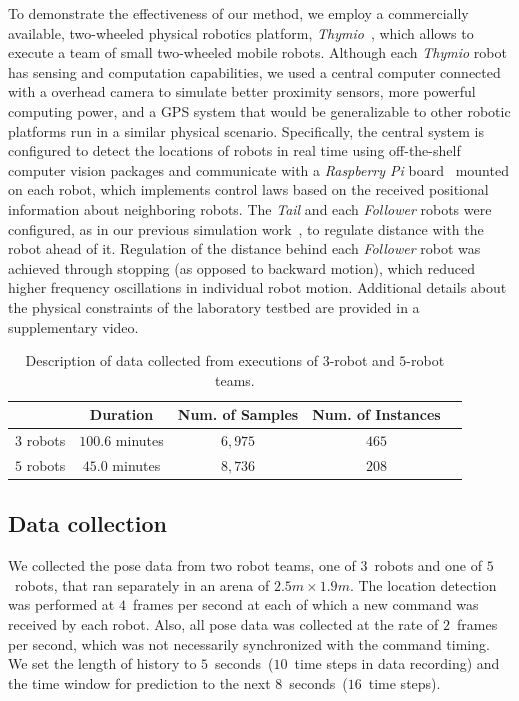 \documentclass[letterpaper, 10 pt, conference]{ieeeconf}  %
\begin{document}
    To demonstrate the effectiveness of our method, we employ a
    commercially available, two-wheeled physical robotics platform,
    \emph{Thymio}~\cite{Shin14}, which allows to execute a team of small
    two-wheeled mobile robots. Although each \emph{Thymio} robot has
    sensing and computation capabilities, we used a central computer
    connected with a overhead camera to simulate better proximity
    sensors, more powerful computing power, and a GPS system that would
    be generalizable to other robotic platforms run in a similar
    physical scenario. Specifically, the central system is configured to
    detect the locations of robots in real time using off-the-shelf
    computer vision packages and communicate with a \emph{Raspberry Pi}
    board~\cite{Upton14} mounted on each robot, which implements control
    laws based on the received positional information about neighboring
    robots. The \emph{Tail} and each \emph{Follower} robots were
    configured, as in our previous simulation work~\cite{CPR17}, to
    regulate distance with the robot ahead of it. Regulation of the
    distance behind each \emph{Follower} robot was achieved through
    stopping (as opposed to backward motion), which reduced higher
    frequency oscillations in individual robot motion. Additional
    details about the physical constraints of the laboratory testbed are
    provided in a supplementary video.
	\setlength{\tabcolsep}{0.5em} %
	{\renewcommand{\arraystretch}{1.2}%
		\begin{table}[t]
			\centering
			\begin{tabular}{|c|c|c|c|c|}
				\hline
				&  Duration & Num. of Samples & Num. of Instances  \\ \hline
				$3$ robots & $100.6$ minutes & $6,975$ & $465$  \\ \hline
				$5$ robots & $45.0$ minutes  & $8,736$ & $208$  \\ \hline
			\end{tabular}
			\caption{Description of data collected from executions of $3$-robot and $5$-robot teams.}
			\label{table:data_description}
		\end{table}
	}
    \subsection{Data collection}

    We collected the pose data from two robot teams, one of
    $3$~robots and one of $5$~robots, that ran separately in an arena of
    $2.5 m \times 1.9 m$. The location detection was performed at
    $4$~frames per second at each of which a new command was received by
    each robot. Also, all pose data was collected at the rate of
    $2$~frames per second, which was not necessarily synchronized with
    the command timing. We set the length of history to
    $5$~seconds~($10$~time steps in data recording) and the time window
    for prediction to the next $8$~seconds~($16$~time steps).
       
\end{document}
